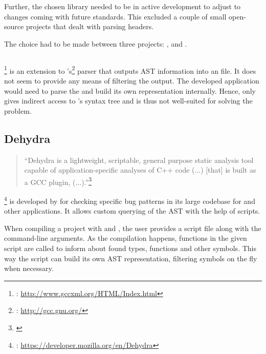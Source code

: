 Further, the chosen library needed to be in active development to adjust to changes coming with future  standards. This excluded a couple of small open-source projects that dealt with parsing  headers.

The choice had to be made between three projects: ,  and .

\subsection{}

\footnote{: \url{http://www.gccxml.org/HTML/Index.html}} is an extension to 's\footnote{: \url{http://gcc.gnu.org/}}   parser that outputs AST information into an  file. It does not seem to provide any means of filtering the output. The developed application would need to parse the  and build its own representation internally. Hence,  only gives indirect access to 's syntax tree and is thus not well-suited for solving the problem.

\newpage
\subsection{Dehydra}

\begin{quotation}
``Dehydra is a lightweight, scriptable, general purpose static analysis tool capable of application-specific analyses of C++ code (...) [that] is built as a GCC plugin, (...).''\footnote{\citep{MDNDehydra}}
\end{quotation}

\footnote{: \url{https://developer.mozilla.org/en/Dehydra}} is developed by  for checking specific bug patterns in its large codebase for  and other  applications. It allows custom querying of the AST with the help of  scripts.

When compiling a project with  and , the user provides a script file along with the command-line arguments. As the compilation happens, functions in the given script are called to inform about found types, functions and other symbols. This way the script can build its own AST representation, filtering symbols on the fly when necessary.

